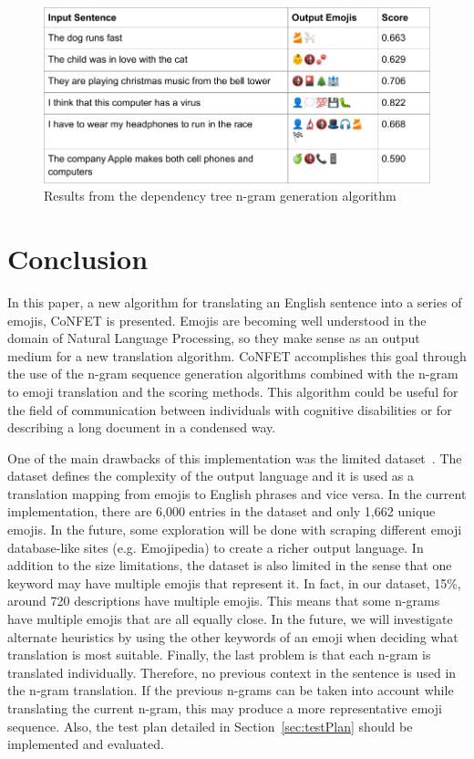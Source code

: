 \documentclass{article}[10]
\begin{document}
\begin{figure}[H]
  \begin{center}
    \includegraphics[width=\columnwidth]{figures/dependency.png}
      \caption{Results from the dependency tree n-gram generation algorithm\label{fig:dependency}}
  \end{center}
\end{figure}

\section{Conclusion}

In this paper, a new algorithm for translating an English sentence into a series of emojis, CoNFET is presented. Emojis are becoming well understood in the domain of Natural Language Processing, so they make sense as an output medium for a new translation algorithm. CoNFET accomplishes this goal through the use of the n-gram sequence generation algorithms combined with the n-gram to emoji translation and the scoring methods. This algorithm could be useful for the field of communication between individuals with cognitive disabilities or for describing a long document in a condensed way.

One of the main drawbacks of this implementation was the limited dataset~\cite{Eisner_2016}. The dataset defines the complexity of the output language and it is used as a translation mapping from emojis to English phrases and vice versa. In the current implementation, there are 6,000 entries in the dataset and only 1,662 unique emojis. In the future, some exploration will be done with scraping different emoji database-like sites (e.g. Emojipedia) to create a richer output language. In addition to the size limitations, the dataset is also limited in the sense that one keyword may have multiple emojis that represent it. In fact, in our dataset, 15\%, around 720 descriptions have multiple emojis. This means that some n-grams have multiple emojis that are all equally close. In the future, we will investigate alternate heuristics by using the other keywords of an emoji when deciding what translation is most suitable. Finally, the last problem is that each n-gram is translated individually. Therefore, no previous context in the sentence is used in the n-gram translation. If the previous n-grams can be taken into account while translating the current n-gram, this may produce a more representative emoji sequence. Also, the test plan detailed in Section~\ref{sec:testPlan} should be implemented and evaluated.

\makeatother


\end{document}
